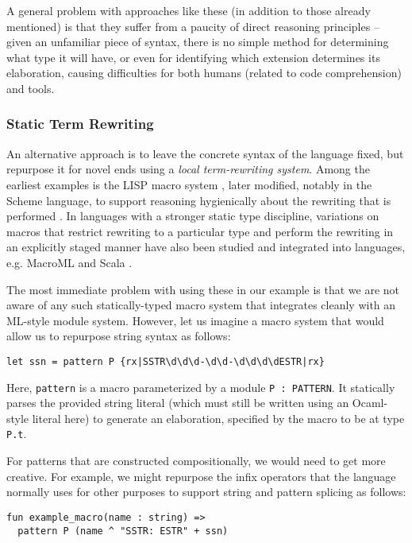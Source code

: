 A general problem with approaches like these (in addition to those already mentioned) is that they  suffer from a paucity of direct reasoning principles -- given an unfamiliar piece of syntax, there is no simple method for determining what type it will have, or even for identifying which extension determines its elaboration, causing difficulties for both humans (related to code comprehension) and tools.

\subsubsection{Static Term Rewriting}
An alternative approach is to leave the concrete syntax of the language fixed, but repurpose it for novel ends using a \emph{local term-rewriting system}. Among the earliest examples is the LISP macro system \cite{Hart63a}, later modified, notably in the Scheme language, to support reasoning hygienically about the rewriting that is performed \cite{Kohlbecker86a}. In languages with a stronger static type discipline, variations on macros that restrict rewriting to a particular type and perform the rewriting in an explicitly staged manner have also been studied \cite{Herman10:Theory,ganz2001macros} and integrated into languages, e.g. MacroML \cite{ganz2001macros} and Scala \cite{ScalaMacros2013}. 

The most immediate problem with using these in our example is that we are not aware of any such statically-typed macro system that integrates cleanly with an ML-style module system. However, let us imagine a macro system that would allow us to repurpose string syntax  as follows:
\begin{lstlisting}[numbers=none]
let ssn = pattern P {rx|SSTR\d\d\d-\d\d-\d\d\d\dESTR|rx}
\end{lstlisting}

Here, \lstinline{pattern} is a macro parameterized by a module \lstinline{P : PATTERN}. It statically parses the provided string literal (which must still be written using an Ocaml-style literal here) to generate an elaboration, specified by the macro to be at type \lstinline{P.t}. 

For patterns that are constructed compositionally, we would need to get more creative. For example, we might repurpose the infix operators that the language normally uses for other purposes to support string and pattern splicing as follows:

\begin{lstlisting}[numbers=none,escapechar=|]
fun example_macro(name : string) => 
  pattern P (name ^ "SSTR: ESTR" + ssn)
\end{lstlisting}

